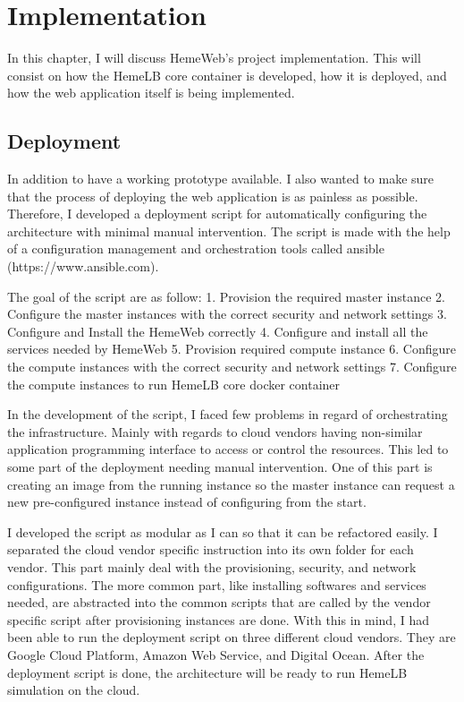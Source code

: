  

\chapter[Implementation]{Implementation}

In this chapter, I will discuss HemeWeb's project implementation. This will consist on how the HemeLB core container is developed, how it is deployed, and how the web application itself is being implemented.


\section{Deployment}

In addition to have a working prototype available. I also wanted to make sure that the process of deploying the web application is as painless as possible. Therefore, I developed a deployment script for automatically configuring the architecture with minimal manual intervention. The script is made with the help of a configuration management and orchestration tools called ansible (https://www.ansible.com).

The goal of the script are as follow:
1. Provision the required master instance
2. Configure the master instances with the correct security and network settings
3. Configure and Install the HemeWeb correctly
4. Configure and install all the services needed by HemeWeb
5. Provision required compute instance
6. Configure the compute instances with the correct security and network settings
7. Configure the compute instances to run HemeLB core docker container

In the development of the script, I faced few problems in regard of orchestrating the infrastructure. Mainly with regards to cloud vendors having non-similar application programming interface to access or control the resources. This led to some part of the deployment needing manual intervention. One of this part is creating an image from the running instance so the master instance can request a new pre-configured instance instead of configuring from the start.

I developed the script as modular as I can so that it can be refactored easily. I separated the cloud vendor specific instruction into its own folder for each vendor. This part mainly deal with the provisioning, security, and network configurations. The more common part, like installing softwares and services needed, are abstracted into the common scripts that are called by the vendor specific script after provisioning instances are done. With this in mind, I had been able to run the deployment script on three different cloud vendors. They are Google Cloud Platform, Amazon Web Service, and Digital Ocean. After the deployment script is done, the architecture will be ready to run HemeLB simulation on the cloud.

